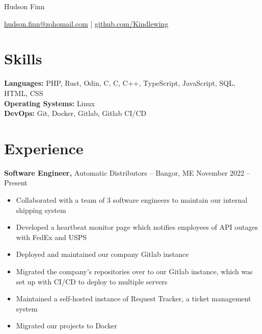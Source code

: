 \documentclass[11pt]{article}       %
\newcommand{\CS}{C\nolinebreak\hspace{-.05em}\raisebox{.6ex}{\scriptsize\bf \#}}
\begin{document}
\centerline{\Huge Hudson Finn}

\vspace{5pt}

\centerline{\href{mailto:hudson.finn@zohomail.com}{hudson.finn@zohomail.com} | \href{https://github.com/Kindlewing}{github.com/Kindlewing}}

\vspace{-10pt}

\section*{Skills}
 \begin{itemize}[leftmargin=0.15in, label={}]
\small{\item{
    \textbf{Languages:} PHP, Rust, Odin, \CS, C, C++, TypeScript, JavaScript, SQL, HTML, CSS \\
    \textbf{Operating Systems:} Linux \\
    \textbf{DevOps:} Git, Docker, Gitlab, Gitlab CI/CD
}}
\end{itemize}
\vspace{-6.5pt}

\section*{Experience}
\textbf{Software Engineer,} {Automatic Distributors} -- Bangor, ME \hfill November 2022 -- Present \\
\vspace{-9pt}
\begin{itemize}
    \item{Collaborated with a team of 3 software engineers to maintain our internal shipping system}
    \item{Developed a heartbeat monitor page which notifies employees of API outages with FedEx and USPS}
    \item{Deployed and maintained our company Gitlab instance}
    \item{Migrated the company's repositories over to our Gitlab instance, 
        which was set up with CI/CD to deploy to multiple servers}
    \item{Maintained a self-hosted instance of Request Tracker, a ticket management system}
    \item{Migrated our projects to Docker}
\end{itemize}


\end{document}
